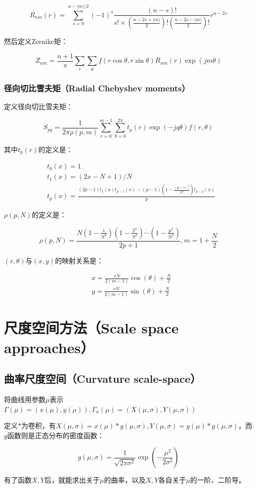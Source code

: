 \documentclass{ctexart}
\begin{document}
\[R_{nm}(r)=\sum_{s=0}^{n-|m|/2}(-1)^s\frac{(n-s)!}{s! \times (\frac{n-2s+|m|}{2})!(\frac{n-2s-|m|}{2})!}r^{n-2s}\]

然后定义Zernike矩：

\[Z_{nm}=\frac{n+1}{\pi}\sum_r\sum_{\theta}f(r\cos \theta,r \sin \theta)R_{nm}(r)\exp(jm\theta)\]
\subsubsection{径向切比雪夫矩（Radial Chebyshev moments）}
定义径向切比雪夫矩：

\[S_{pq}=\frac{1}{2\pi \rho(p,m)}\sum_{r=0}^{m-1}\sum_{\theta=0}^{2\pi}t_p(r)\exp(-jq\theta)f(r,\theta)\]

其中$t_p(r)$的定义是：

\begin{align*}
& t_0(x)=1 \\
& t_1(x)=(2x-N+1)/N \\
& t_p(x)=\frac{(2p-1)t_1(x)t_{p-1}(x)-(p-1)(1-\frac{(p-1)^2}{N^2})t_{p-2}(x)}{p}
\end{align*}

$\rho(p,N)$的定义是：

\[\rho(p,N)=\frac{N(1-\frac{1}{N^2})(1-\frac{2^2}{N^2})\cdots (1-\frac{p^2}{N^2})}{2p+1},m=1+\frac{N}{2}\]

$(r,\theta)$与$(x,y)$的映射关系是：

\begin{align*}
& x=\frac{rN}{2(m-1)}\cos(\theta)+\frac{N}{2} \\
& y=\frac{rN}{2(m-1)}\sin(\theta)+\frac{N}{2}
\end{align*}
\section{尺度空间方法（Scale space approaches）}
\subsection{曲率尺度空间（Curvature scale-space）}
将曲线用参数$\mu$表示$\Gamma(\mu)=(x(\mu),y(\mu)),\Gamma_{\sigma}(\mu)=(X(\mu,\sigma),Y(\mu,\sigma))$

定义$*$为卷积，有$X(\mu,\sigma)=x(\mu)*g(\mu,\sigma),Y(\mu,\sigma)=y(\mu)*g(\mu,\sigma)$，而$g$函数则是正态分布的密度函数：

\[g(\mu,\sigma)=\frac{1}{\sqrt{2 \pi \sigma^2}} \exp(-\frac{\mu^2}{2\sigma^2})\]

有了函数$X,Y$后，就能求出关于$\mu$的曲率，以及$X,Y$各自关于$\mu$的一阶、二阶导。
\end{document}
